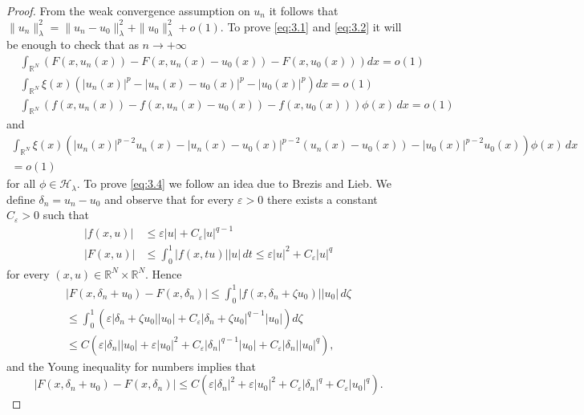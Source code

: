 \documentclass[11pt]{amsart}
\numberwithin{equation}{section}
\theoremstyle{remark}
\theoremstyle{definition}
\begin{document}
\begin{proof}
	From the weak convergence assumption on $u_n$ it follows that $\|u_n\|_\lambda^2 = \|u_n-u_0\|_\lambda^2 +\|u_0\|_\lambda^2 + o(1)$. To prove \eqref{eq:3.1} and \eqref{eq:3.2} it will be enough to check that as $n \to +\infty$
	\begin{align}
	&\int_{\mathbb{R}^N} \left(F(x,u_n(x))-F(x,u_n(x)-u_0(x))-F(x,u_0(x)) \right) dx =o(1) \label{eq:3.4} \\
	&\int_{\mathbb{R}^N} \xi(x)\left(|u_n(x)|^p - |u_n(x) - u_0(x)|^p -|u_0(x)|^p \right) dx =o(1) \label{eq:3.5} \\
	&\int_{\mathbb{R}^N} \left(f(x,u_n(x)) -f(x,u_n(x)-u_0(x))-f(x,u_0(x)) \right)  \phi(x)\, dx =o(1) \label{eq:3.6}
\end{align}
and	
\begin{multline}	
\int_{\mathbb{R}^N} \xi(x) (|u_n(x)|^{p-2}u_n(x) -|u_n(x)-u_0(x)|^{p-2}(u_n(x)-u_0(x))-|u_0(x)|^{p-2}u_0(x)) \phi(x) \, dx \\
= o(1) \label{eq:3.7}
\end{multline}
for all $\phi \in \mathscr{H}_\lambda$. To prove \eqref{eq:3.4} we follow an idea due to Brezis and Lieb. We define $\delta_n = u_n - u_0$ and observe that for every $\varepsilon>0$ there exists a constant $C_\varepsilon>0$ such that
\begin{align}
|f(x,u)| &\leqslant \varepsilon |u| + C_\varepsilon |u|^{q-1} \\
|F(x,u)| &\leqslant \int_0^1 \left| f(x,tu) \right| |u|\, dt \leqslant \varepsilon |u|^2 + C_\varepsilon |u|^{q} \label{eq:3.9}
\end{align}
for every $(x,u) \in \mathbb{R}^N \times \mathbb{R}^N$. Hence
\begin{multline*}
\left| F(x,\delta_n + u_0) -F(x,\delta_n) \right| \leqslant \int_0^1 |f(x,\delta_n + \zeta u_0)| |u_0|\, d\zeta
\\
\leqslant \int_0^1 \left( \varepsilon |\delta_n + \zeta u_0||u_0| + C_\varepsilon |\delta_n + \zeta u_0|^{q-1} |u_0| \right)  d\zeta \\
\leqslant C \left( \varepsilon |\delta_n||u_0| + \varepsilon |u_0|^2 + C_\varepsilon |\delta_n|^{q-1} |u_0| + C_\varepsilon |\delta_n| |u_0|^{q}  \right),
\end{multline*}
and the Young inequality for numbers implies that
\begin{equation*}
\left| F(x,\delta_n + u_0) -F(x,\delta_n) \right| \leqslant 
C \left( \varepsilon |\delta_n|^2 + \varepsilon |u_0|^2   +C_\varepsilon |\delta_n|^{q}  + C_\varepsilon |u_0|^{q}  \right).

\end{equation*}
\end{proof}
\end{document}
